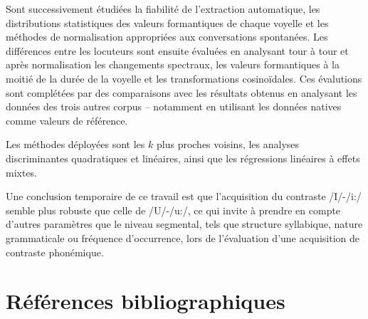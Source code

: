 \documentclass[
  10pt,
]{article}
\begin{document}
Sont successivement étudiées la fiabilité de l'extraction automatique, les distributions statistiques
des valeurs formantiques de chaque voyelle et les méthodes de normalisation appropriées aux
conversations spontanées. Les différences entre les locuteurs sont ensuite évaluées en analysant
tour à tour et après normalisation les changements spectraux, les valeurs formantiques à la moitié
de la durée de la voyelle et les transformations cosinoïdales. Ces évalutions sont complétées par
des comparaisons avec les résultats obtenus en analysant les données des trois autres corpus --
notamment en utilisant les données natives comme valeurs de référence.

Les méthodes déployées sont les \(k\) plus proches voisins, les analyses discriminantes quadratiques
et linéaires, ainsi que les régressions linéaires à effets mixtes.

Une conclusion temporaire de ce travail est que l'acquisition du contraste /I/-/i:/ semble plus
robuste que celle de /U/-/u:/, ce qui invite à prendre en compte d'autres paramètres que le niveau
segmental, tels que structure syllabique, nature grammaticale ou fréquence d'occurrence, lors de l'évaluation d'une acquisition de contraste phonémique.

\hypertarget{ruxe9fuxe9rences-bibliographiques}{%
\section*{Références bibliographiques}\label{ruxe9fuxe9rences-bibliographiques}}
\end{document}
